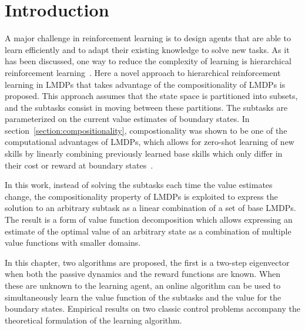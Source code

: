 \section{Introduction}
A major challenge in reinforcement learning is to design agents that are able to learn efficiently and to adapt their existing knowledge to solve new tasks. As it has been discussed, one way to reduce the complexity of learning is hierarchical reinforcement learning~\citep{Sutton1999, Dietterich2000, Barto2003}. Here a novel approach to hierarchical reinforcement learning in LMDPs that takes advantage of the compositionality of LMDPs is proposed. This approach assumes that the state space is partitioned into subsets, and the subtasks consist in moving between these partitions. The subtasks are parameterized on the current value estimates of boundary states. 
In section~\ref{section:compositionality}, compostionality was shown to be one of the computational advantages of LMDPs, which allows for zero-shot learning of new skills by linearly combining previously learned base skills which only differ in their cost or reward at boundary states~\citep{Todorov2009,Silva2009}. 

In this work, instead of solving the subtasks each time the value estimates change, the compositionality property of LMDPs is exploited to express the solution to an arbitrary subtask as a linear combination of a set of base LMDPs. The result is a form of value function decomposition which allows expressing an estimate of the optimal value of an arbitrary state as a combination of multiple value functions with smaller domains.

In this chapter, two algorithms are proposed, the first is a two-step eigenvector when both the passive dynamics and the reward functions are known. When these are unknown to the learning agent, an online algorithm can be used to simultaneously learn the value function of the subtasks and the value for the boundary states. Empirical results on two classic control problems accompany the theoretical formulation of the learning algorithm.
